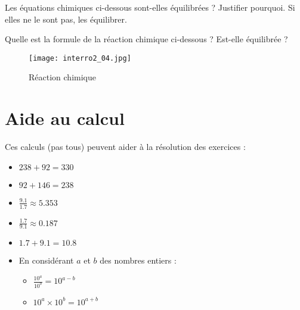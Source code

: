 \documentclass{exam}
\begin{document}
\begin{questions}
  \question[1.5] Les équations chimiques ci-dessous sont-elles équilibrées ? Justifier pourquoi. Si elles ne le sont pas, les équilibrer.

\question[0.75] Quelle est la formule de la réaction chimique ci-dessous ? Est-elle équilibrée ?

\begin{figure}[H]
  \centering
  \texttt{[image: interro2\_04.jpg]}
  \caption{Réaction chimique}
\end{figure} 


\end{questions}

\section*{Aide au calcul}

Ces calculs (pas tous) peuvent aider à la résolution des exercices :
\begin{itemize}
  \item $238 + 92 = 330$
  \item $92 + 146 = 238$
  \item $\frac{9.1}{1.7} \approx 5.353$
  \item $\frac{1.7}{9.1} \approx 0.187$
  \item $1.7 + 9.1 = 10.8$
  \item En considérant $a$ et $b$ des nombres entiers : 
  \begin{itemize}
    \item $\frac{10^a}{10^b} = 10^{a-b}$
    \item $10^a \times 10^b = 10^{a+b}$ 
  \end{itemize}
\end{itemize}
\end{document}
